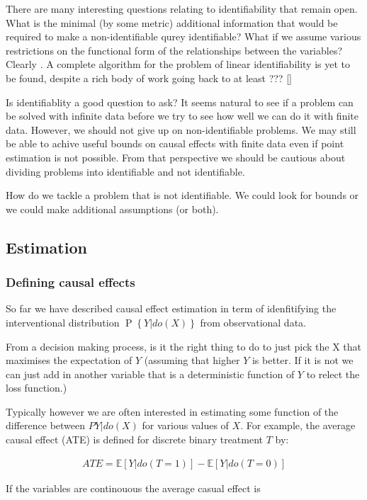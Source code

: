 \documentclass[11pt,a4paper,oneside]{book}
\newcommand{\E}[1]{\mathbb E\left[{#1}\right]}
\newcommand{\eqn}[1]{\begin{align}#1\end{align}}
\renewcommand{\P}[1]{\operatorname{P}\left\{#1\right\}}
\begin{document}

There are many interesting questions relating to identifiability that remain open. What is the minimal (by some metric) additional information that would be required to make a non-identifiable qurey identifiable? What if we assume various restrictions on the functional form of the relationships between the variables? Clearly  . A complete algorithm for the problem of linear identifiability is yet to be found, despite a rich body of work going back to at least ??? \ref{}

Is identifiablity a good question to ask? It seems natural to see if a problem can be solved with infinite data before we try to see how well we can do it with finite data. However, we should not give up on non-identifiable problems. We may still be able to achive useful bounds on causal effects with finite data even if point estimation is not possible. From that perspective we should be cautious about dividing problems into identifiable and not identifiable. 

How do we tackle a problem that is not identifiable. We could look for bounds or we could make additional assumptions (or both). 

\subsection*{Estimation}
\subsubsection*{Defining causal effects} 
So far we have described causal effect estimation in term of idenfitifying the interventional distribution $\P{Y|do(X)}$ from observational data. 

From a decision making process, is it the right thing to do to just pick the X that maximises the expectation of $Y$ (assuming that higher $Y$ is better. If it is not we can just add in another variable that is a deterministic function of $Y$ to relect the loss function.)

Typically however we are often interested in estimating some function of the difference between $P{Y|do(X)}$ for various values of $X$. For example, the average causal effect (ATE) is defined for discrete binary treatment $T$ by:

\eqn{
ATE = \E{Y|do(T = 1)} - \E{Y|do(T=0)}
}

If the variables are continouous the average casual effect is 
\end{document}
